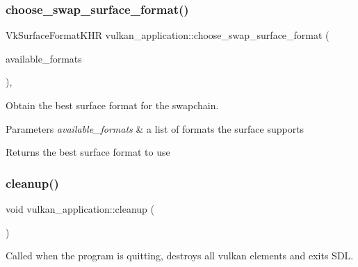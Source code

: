 \subsubsection{\texorpdfstring{choose\+\_\+swap\+\_\+surface\+\_\+format()}{choose\_swap\_surface\_format()}}
{\footnotesize\ttfamily Vk\+Surface\+Format\+K\+HR vulkan\+\_\+application\+::choose\+\_\+swap\+\_\+surface\+\_\+format (\begin{DoxyParamCaption}\item[{const std\+::vector$<$ Vk\+Surface\+Format\+K\+HR $>$ \&}]{available\+\_\+formats }\end{DoxyParamCaption})\hspace{0.3cm}{\ttfamily [static]}, {\ttfamily [private]}}



Obtain the best surface format for the swapchain. 


\begin{DoxyParams}{Parameters}
{\em available\+\_\+formats} & a list of formats the surface supports \\
\hline
\end{DoxyParams}
\begin{DoxyReturn}{Returns}
the best surface format to use 
\end{DoxyReturn}
\mbox{\label{classvulkan__application_a662efdabab9edb2e63cb86850352bfc8}} 
\subsubsection{\texorpdfstring{cleanup()}{cleanup()}}
{\footnotesize\ttfamily void vulkan\+\_\+application\+::cleanup (\begin{DoxyParamCaption}{ }\end{DoxyParamCaption})\hspace{0.3cm}{\ttfamily [private]}}



Called when the program is quitting, destroys all vulkan elements and exits S\+DL. 

\mbox{\label{classvulkan__application_a0ae5cac286b8379d17b3451dc7370790}} 
